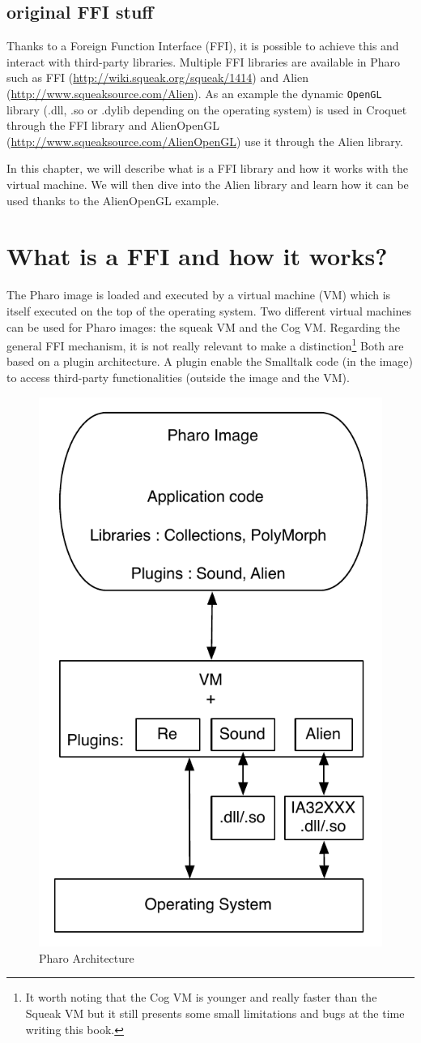 \documentclass[a4paper,10pt,twoside]{book}
\begin{document}
\subsection{original FFI stuff}

Thanks to a Foreign Function Interface (FFI), it is possible to achieve this and interact with third-party libraries.
Multiple FFI libraries are available in Pharo such as FFI (\url{http://wiki.squeak.org/squeak/1414}) and Alien (\url{http://www.squeaksource.com/Alien}).
As an example the dynamic \texttt{OpenGL} library (.dll, .so or .dylib depending on the operating system) is used in Croquet through the FFI library and AlienOpenGL (\url{http://www.squeaksource.com/AlienOpenGL}) use it through the Alien library.

In this chapter, we will describe what is a FFI library and how it works with the virtual machine. 
We will then dive into the Alien library and learn how it can be used thanks to the AlienOpenGL example.

\section{What is a FFI and how it works?}

The Pharo image is loaded and executed by a virtual machine (VM) which is itself executed on the top of the operating system. 
Two different virtual machines can be used for Pharo images: the squeak VM and the Cog VM.
Regarding the general FFI mechanism, it is not really relevant to make a distinction\footnote{It worth noting that the Cog VM is younger and really faster than the Squeak VM but it still presents some small limitations and bugs at the time writing this book.} 
Both are based on a plugin architecture.
A plugin enable the Smalltalk code (in the image) to access third-party functionalities (outside the image and the VM).

\begin{figure}[htbp]
	\centering
		\includegraphics[width=0.4\linewidth]{figs/plugins.pdf}
	\caption{Pharo Architecture}
	\label{fig:plugins}
\end{figure}
\end{document}
